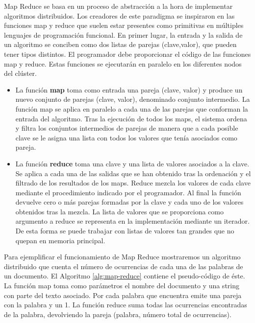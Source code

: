 \documentclass[10pt]{article}
\begin{document}
		Map Reduce se basa en un proceso de abstracción a la hora de implementar algoritmos distribuidos. Los creadores de este paradigma se inspiraron en las funciones map y reduce que suelen estar presentes como primitivas en múltiples lenguajes de programación funcional. En primer lugar, la entrada y la salida de un algoritmo se conciben como dos listas de parejas (clave,valor), que pueden tener tipos distintos. El programador debe proporcionar el código de las funciones map y reduce. Estas funciones se ejecutarán en paralelo en los diferentes nodos del clúster.
		
		\begin{itemize}
			\item La función \textbf{map} toma como entrada una pareja (clave, valor) y produce un nuevo conjunto de parejas (clave, valor), denominado conjunto intermedio. La función map se aplica en paralelo a cada una de las parejas que conforman la entrada del algoritmo. Tras la ejecución de todos los maps, el sistema ordena y filtra los conjuntos intermedios de parejas de manera que a cada posible clave se le asigna una lista con todos los valores que tenía asociados como pareja.
			\item La función \textbf{reduce} toma una clave y una lista de valores asociados a la clave. Se aplica a cada una de las salidas que se han obtenido tras la ordenación y el filtrado de los resultados de los maps. Reduce mezcla los valores de cada clave mediante el procedimiento indicado por el programador. Al final la función devuelve cero o más parejas formadas por la clave y cada uno de los valores obtenidos tras la mezcla. La lista de valores que se proporciona como argumento a reduce se representa en la implementación mediante un iterador. De esta forma se puede trabajar con listas de valores tan grandes que no quepan en memoria principal.
		\end{itemize}  
		
		Para ejemplificar el funcionamiento de Map Reduce mostraremos un algoritmo distribuido que cuenta el número de ocurrencias de cada una de las palabras de un documento. El Algoritmo \ref{alg:map-reduce} contiene el pseudo-código de éste. La función map toma como parámetros el nombre del documento y una string con parte del texto asociado. Por cada palabra que encuentra emite una pareja con la palabra y un 1. La función reduce suma todas las ocurrencias encontradas de la palabra, devolviendo la pareja (palabra, número total de ocurrencias).
		
\end{document}
